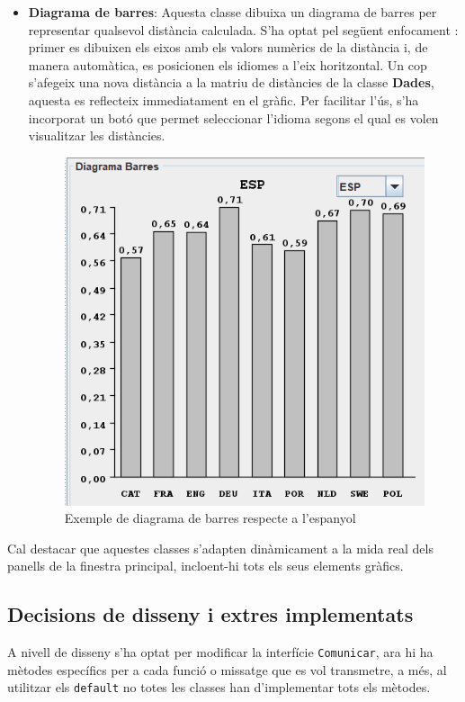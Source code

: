\documentclass{ieeetj}
\begin{document}
\begin{itemize}
\begin{itemize}
     \item \textbf{Diagrama de barres}: Aquesta classe dibuixa un diagrama de barres per representar qualsevol distància calculada. 
        S'ha optat pel següent enfocament : primer es dibuixen els eixos amb els valors numèrics de la distància i, de manera automàtica, es posicionen els idiomes a l'eix horitzontal. Un cop s'afegeix una nova distància a la matriu de distàncies de la classe \textbf{Dades}, aquesta es reflecteix immediatament en el gràfic.
        Per facilitar l'ús, s'ha incorporat un botó que permet seleccionar l'idioma segons el qual es volen visualitzar les distàncies.
        \begin{figure}[H]
            \centering
            \includegraphics[width=0.5\linewidth]{png/diagramaB.png}
            \caption{Exemple de diagrama de barres respecte a l'espanyol}
            \label{fig:enter-label}
        \end{figure}
    \end{itemize}
\end{itemize}

Cal destacar que aquestes classes s'adapten dinàmicament a la mida real dels panells de la finestra principal, incloent-hi tots els seus elements gràfics.


\subsection{Decisions de disseny i extres implementats}
A nivell de disseny s'ha optat per modificar la interfície \texttt{Comunicar}, ara hi ha mètodes específics per a cada funció o missatge que es vol transmetre, a més, al utilitzar els \texttt{default} no totes les classes han d'implementar tots els mètodes.
\end{document}
